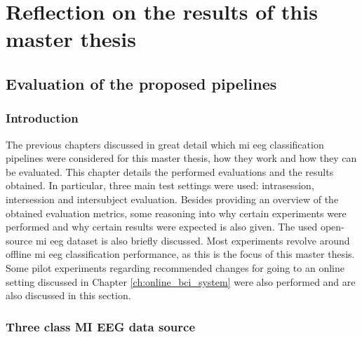 


\part{Reflection on the results of this master thesis}
\label{part:reflection}

\chapter{Evaluation of the proposed pipelines}
\label{ch:evaluation}

\section{Introduction}
\label{sec:evaluation_introduction}

The previous chapters discussed in great detail which \gls{mi} \gls{eeg} classification pipelines were considered for this master thesis, how they work and how they can be evaluated.
This chapter details the performed evaluations and the results obtained.
In particular, three main test settings were used: intrasession, intersession and intersubject evaluation.
Besides providing an overview of the obtained evaluation metrics, some reasoning into why certain experiments were performed and why certain results were expected is also given.
The used open-source \gls{mi} \gls{eeg} dataset is also briefly discussed.
Most experiments revolve around offline \gls{mi} \gls{eeg} classification performance, as this is the focus of this master thesis.
Some pilot experiments regarding recommended changes for going to an online setting discussed in Chapter \ref{ch:online_bci_system} were also performed and are also discussed in this section.

\section{Three class MI EEG data source}
\label{sec:evaluation_data_source}

